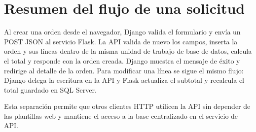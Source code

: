 \documentclass[11pt,a4paper]{article}
\begin{document}
\section{Resumen del flujo de una solicitud}

Al crear una orden desde el navegador, Django valida el formulario y envía un POST JSON al servicio Flask. La API valida de nuevo los campos, inserta la orden y sus líneas dentro de la misma unidad de trabajo de base de datos, calcula el total y responde con la orden creada. Django muestra el mensaje de éxito y redirige al detalle de la orden. Para modificar una línea se sigue el mismo flujo: Django delega la escritura en la API y Flask actualiza el subtotal y recalcula el total guardado en SQL Server.

Esta separación permite que otros clientes HTTP utilicen la API sin depender de las plantillas web y mantiene el acceso a la base centralizado en el servicio de API.
\end{document}
